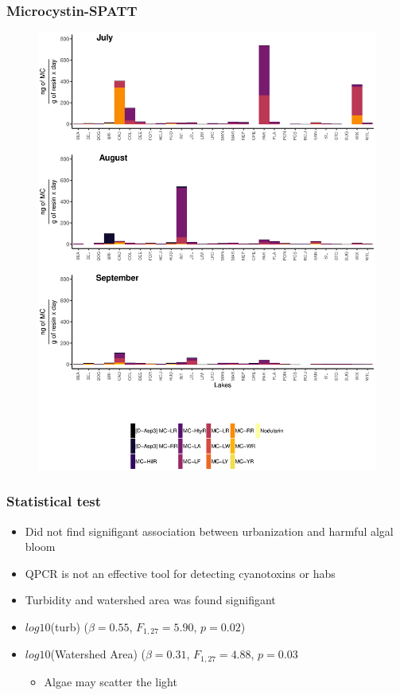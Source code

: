 \begin{frame}
	\frametitle{Microcystin-SPATT}

	\begin{figure}
		\includegraphics[width=\textwidth,height=1.04\textheight]{1spatter.eps}
	\end{figure}
\end{frame}

\begin{frame}
	\frametitle{Statistical test}
	\begin{itemize}
		\item Did not find signifigant association between urbanization and harmful algal bloom
		\item QPCR is not an effective tool for detecting cyanotoxins or habs
		\item Turbidity and watershed area was found signifigant
		\item $log10$(turb) ($\beta=0.55$, $F_{{1,27}}=5.90$, $p=0.02$)
		\item $log10$(Watershed Area) ($\beta=0.31$, $F_{{1,27}}=4.88$, $p=0.03$
			\begin{itemize} 
				\item Algae may scatter the light
			\end{itemize}
	\end{itemize}
	\end{frame}


